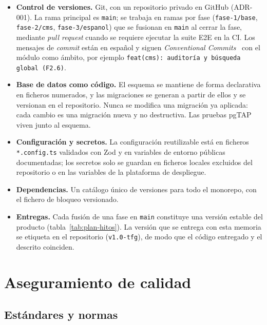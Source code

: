 \begin{itemize}
  \item \textbf{Control de versiones.} Git, con un repositorio privado en
        GitHub (ADR-001). La
        rama principal es \texttt{main}; se trabaja en ramas por fase
        (\texttt{fase-1/base}, \texttt{fase-2/cms}, \texttt{fase-3/espanol}) que
        se fusionan en \texttt{main} al cerrar la fase, mediante
        \textit{pull request} cuando se requiere ejecutar la suite E2E en la
        CI. Los mensajes de \textit{commit} están en español y siguen
        \textit{Conventional Commits}~\cite{conventionalcommits} con el módulo
        como ámbito, por ejemplo \texttt{feat(cms): auditoría y búsqueda
        global (F2.6)}.
  \item \textbf{Base de datos como código.} El esquema se mantiene de forma
        declarativa en ficheros numerados, y las migraciones se generan a
        partir de ellos y se versionan en el repositorio. Nunca se modifica una
        migración ya aplicada: cada cambio es una migración nueva y no
        destructiva. Las pruebas pgTAP viven junto al esquema.
  \item \textbf{Configuración y secretos.} La configuración reutilizable está
        en ficheros \texttt{*.config.ts} validados con Zod y en variables de
        entorno públicas documentadas; los secretos solo se guardan en
        ficheros locales excluidos del repositorio o en las variables de la
        plataforma de despliegue.
  \item \textbf{Dependencias.} Un catálogo único de versiones para todo el
        monorepo, con el fichero de bloqueo versionado.
  \item \textbf{Entregas.} Cada fusión de una fase en \texttt{main} constituye
        una versión estable del producto (tabla~\ref{tab:plan-hitos}). La
        versión que se entrega con esta memoria se etiqueta en el repositorio
        (\texttt{v1.0-tfg}), de modo que el código entregado y el descrito
        coinciden.
\end{itemize}

\section{Aseguramiento de calidad}
\label{sec:plan-calidad}

\subsection{Estándares y normas}

